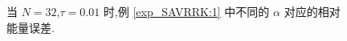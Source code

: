 \documentclass[aspectratio=169]{beamer}
\numberwithin{theorem}{section} %
\begin{document}
\begin{frame}%
	\begin{figure}[H]
		\begin{center}
		\caption{当 $N=32$,$\tau=0.01$ 时,例 \ref{exp_SAVRRK:1} 中不同的 $\alpha$ 对应的相对能量误差.}
		\label{fig_SAVRRK:4-1}
		\end{center}
		\end{figure}
\end{frame}
\end{document}

